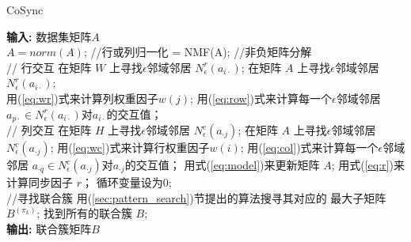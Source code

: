 {\renewcommand\baselinestretch{1.0}\selectfont  %
\begin{algorithm}[!p]
\caption{CoSync}
\label{alg:CoSync}
\begin{algorithmic}[1]
\small{
\STATE \textbf{输入:} 数据集矩阵$A$\\[1ex]
\STATE $A = norm(A)$; //行或列归一化
    \STATE [W, H] = NMF(A); //非负矩阵分解
\ENDIF \\[1ex]
    \STATE // 行交互
            \STATE 在矩阵 $W$ 上寻找$\epsilon$邻域邻居 $N_{\epsilon}^{r}(a_{i\cdot})$;
        \ELSE
            \STATE 在矩阵 $A$ 上寻找$\epsilon$邻域邻居 $N_{\epsilon}^{r}(a_{i\cdot})$;
        \ENDIF\\[1ex]
            \STATE 用(\ref{eq:wr})式来计算列权重因子$w(j)$;
        \ENDFOR
        \STATE 用(\ref{eq:row})式来计算每一个$\epsilon$邻域邻居%
        $a_{p\cdot}\in N_{\epsilon}^{r}(a_{i\cdot})$对$a_{i\cdot}$的交互值；
    \ENDFOR\\[1ex]
    \STATE // 列交互
            \STATE 在矩阵 $H$ 上寻找$\epsilon$邻域邻居 $N_{\epsilon}^{c}(a_{\cdot{}j})$;
        \ELSE
            \STATE 在矩阵 $A$ 上寻找$\epsilon$邻域邻居 $N_{\epsilon}^{c}(a_{\cdot{}j})$;
        \ENDIF
            \STATE 用(\ref{eq:wc})式来计算行权重因子$w(i)$;
        \ENDFOR
        \STATE 用(\ref{eq:col})式来计算每一个$\epsilon$邻域邻居%
        $a_{\cdot{}q}\in N_{\epsilon}^{c}(a_{\cdot{}j})$对$a_{\cdot{}j}$的交互值；
    \ENDFOR
    \STATE 用式(\ref{eq:model})来更新矩阵 $A$;
    \STATE 用式(\ref{eq:r})来计算同步因子 $r$；
        \STATE 循环变量设为$0$;
     \ENDIF
 \ENDWHILE\\[1ex]
\STATE //寻找联合簇
         \STATE 用(\ref{sec:pattern_search})节提出的算法搜寻其对应的%
         最大子矩阵$B^{(\pi_k)}$;
     \ENDFOR
      \STATE 找到所有的联合簇 $B$;\\[1ex]
\STATE \textbf{输出:} 联合簇矩阵$B$
}
\end{algorithmic}
\end{algorithm}
\par} %

